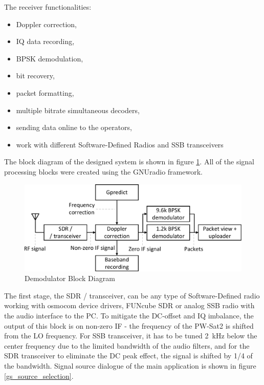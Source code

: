 The receiver  functionalities:
\begin{itemize}
    \item Doppler correction,
    \item IQ data recording,
    \item BPSK demodulation,
    \item bit recovery,
    \item packet formatting,
    \item multiple bitrate simultaneous decoders,
    \item sending data online to the operators,
    \item work with different Software-Defined Radios and SSB transceivers
\end{itemize}

The block diagram of the designed system is shown in figure \ref{demodulator_block_diagram}. All of the signal processing blocks were created using the GNUradio framework.

\begin{figure}[H]
    \centering
    \includegraphics[width=0.6\paperwidth]{img/7/demodulator_block_diagram.pdf}
    \caption{Demodulator Block Diagram}
    \label{demodulator_block_diagram}
\end{figure}

The first stage, the SDR / transceiver, can be any type of Software-Defined radio working with osmocom device drivers, FUNcube SDR or analog SSB radio with the audio interface to the PC. To mitigate the DC-offset and IQ imbalance, the output of this block is on non-zero IF - the frequency of the PW-Sat2 is shifted from the LO frequency. For SSB transceiver, it has to be tuned \SI{2}{\kHz} below the center frequency due to the limited bandwidth of the audio filters, and for the SDR transceiver to eliminate the DC peak effect, the signal is shifted by 1/4 of the bandwidth. Signal source dialogue of the main application is shown in figure \ref{gs_source_selection}.

